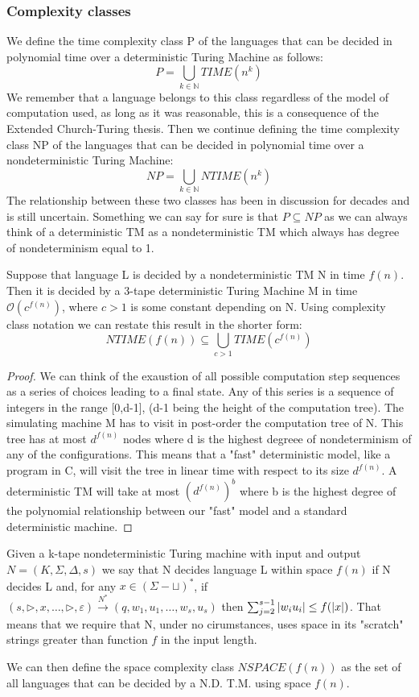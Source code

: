 \subsubsection{Complexity classes}
We define the time complexity class P of the languages that can be decided in polynomial time over a deterministic Turing Machine as follows:
\[ 
    P = \bigcup_{k\in \mathbb{N}}{TIME(n^k)}
\]We remember that a language belongs to this class regardless of the model of computation used, as long as it was reasonable, this is a consequence of the Extended Church-Turing thesis. Then we continue defining the time complexity class NP of the languages that can be decided in polynomial time over a nondeterministic Turing Machine:
\[ 
    NP = \bigcup_{k\in \mathbb{N}}{NTIME(n^k)}
\]The relationship between these two classes has been in discussion for decades and is still uncertain. Something we can say for sure is that $P \subseteq NP$ as we can always think of a deterministic TM as a nondeterministic TM which always has degree of nondeterminism equal to 1.
\begin{theorem}
    Suppose that language L is decided by a nondeterministic TM N in time $f(n)$. Then it is decided by a 3-tape deterministic Turing Machine M in time $\mathcal{O}(c^{f(n)})$, where $c> 1$ is some constant depending on N. Using complexity class notation we can restate this result in the shorter form:
    \[ 
        NTIME(f(n)) \subseteq \bigcup_{c>1}{TIME(c^{f(n)})} 
    \]
    \begin{proof}
        We can think of the exaustion of all possible computation step sequences as a series of choices leading to a final state. Any of this series is a sequence of integers in the range [0,d-1], (d-1 being the height of the computation tree). The simulating machine M has to visit in post-order the computation tree of N. This tree has at most $d^{f(n)}$ nodes where d is the highest degreee of nondeterminism of any of the configurations. This means that a "fast" deterministic model, like a program in C, will visit the tree in linear time with respect to its size $d^{f(n)}$. A deterministic TM will take at most $(d^{f(n)})^b$ where b is the highest degree of the polynomial relationship between our "fast" model and a standard deterministic machine. 
    \end{proof}
\end{theorem}
\begin{definition}
    Given a k-tape nondeterministic Turing machine with input and output $N=(K, \Sigma, \Delta, s)$ we say that N decides language L within space $f(n)$ if N decides L and, for any $x\in (\Sigma-{\sqcup})^*$, if $(s,\triangleright,x,\ldots,\triangleright,\varepsilon) \overset{N^*}{\longrightarrow}(q,w_1,u_1,\ldots,w_s,u_s)$ then $\sum_{j=2}^{s-1}{\left\lvert w_iu_i\right\rvert}\leq f(\left\lvert x\right\rvert)$. That means that we require that N, under no cirumstances, uses space in its "scratch" strings greater than function $f$ in the input length. 
\end{definition}
We can then define the space complexity class $NSPACE(f(n))$ as the set of all languages that can be decided by a N.D. T.M. using space $f(n)$. 
